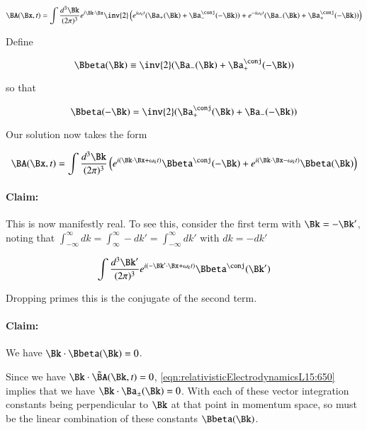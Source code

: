 \begin{equation}\label{eqn:relativisticElectrodynamicsL15:670}
\BA(\Bx, t) 
= \int \frac{d^3 \Bk}{(2 \pi)^3} e^{i \Bk \cdot \Bx} 
\inv{2} \left( 
e^{i \omega_k t} (\Ba_{+}(\Bk) + \Ba_{-}^\conj(-\Bk)) 
+e^{-i \omega_k t} (\Ba_{-}(\Bk) + \Ba_{+}^\conj(-\Bk)) 
\right)
\end{equation}

Define

\begin{equation}\label{eqn:relativisticElectrodynamicsL15:690}
\Bbeta(\Bk) \equiv \inv{2} (\Ba_{-}(\Bk) + \Ba_{+}^\conj(-\Bk) )
\end{equation}

so that

\begin{equation}\label{eqn:relativisticElectrodynamicsL15:710}
\Bbeta(-\Bk) = \inv{2} (\Ba_{+}^\conj(\Bk) + \Ba_{-}(-\Bk))
\end{equation}

Our solution now takes the form

\begin{equation}\label{eqn:relativisticElectrodynamicsL15:730}
\BA(\Bx, t) = \int \frac{d^3\Bk}{(2 \pi)^3} \left( 
e^{i (\Bk \cdot \Bx + \omega_k t)} \Bbeta^\conj(-\Bk)
+e^{i (\Bk \cdot \Bx - \omega_k t)} \Bbeta(\Bk)
\right)
\end{equation}

\paragraph{Claim:}

This is now manifestly real.  To see this, consider the first term with $\Bk = -\Bk'$, noting that $\int_{-\infty}^\infty dk = \int_{\infty}^\infty -dk' = \int_{-\infty}^\infty dk' $ with $dk = -dk'$

\begin{equation}\label{eqn:relativisticElectrodynamicsL15:860}
\int \frac{d^3\Bk'}{(2 \pi)^3} e^{i (-\Bk' \cdot \Bx + \omega_k t)} \Bbeta^\conj(\Bk')
\end{equation}

Dropping primes this is the conjugate of the second term.

\paragraph{Claim:}

We have $\Bk \cdot \Bbeta(\Bk)  = 0$.

Since we have $\Bk \cdot \tilde{\BA}(\Bk, t) = 0$, \ref{eqn:relativisticElectrodynamicsL15:650} implies that we have $\Bk \cdot \Ba_{\pm}(\Bk) = 0$.  With each of these vector integration constants being perpendicular to $\Bk$ at that point in momentum space, so must be the linear combination of these constants $\Bbeta(\Bk)$.

\EndArticle

